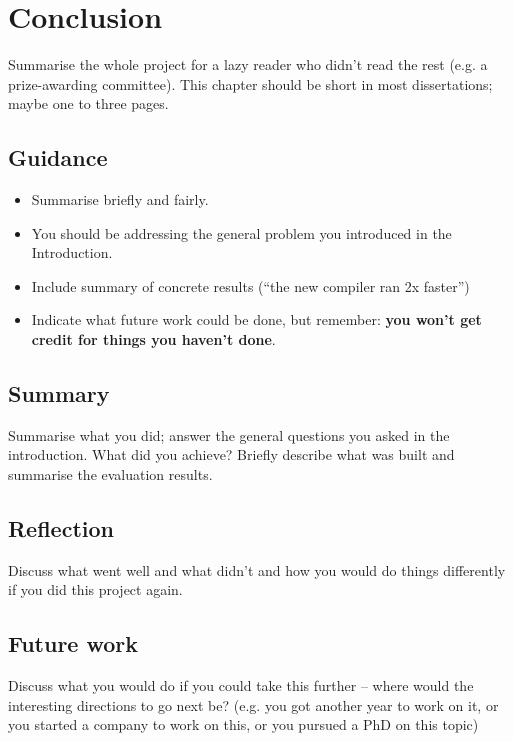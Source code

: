 \documentclass{l4proj}
\begin{document}
\chapter{Conclusion}


Summarise the whole project for a lazy reader who didn't read the rest (e.g. a prize-awarding committee). This chapter should be short in most dissertations; maybe one to three pages.
\section{Guidance}
\begin{itemize}
    \item
          Summarise briefly and fairly.
    \item
          You should be addressing the general problem you introduced in the
          Introduction.
    \item
          Include summary of concrete results (``the new compiler ran 2x
          faster'')
    \item
          Indicate what future work could be done, but remember: \textbf{you
              won't get credit for things you haven't done}.
\end{itemize}

\section{Summary}
Summarise what you did; answer the general questions you asked in the introduction. What did you achieve? Briefly describe what was built and summarise the evaluation results.

\section{Reflection}
Discuss what went well and what didn't and how you would do things differently if you did this project again.

\section{Future work}
Discuss what you would do if you could take this further -- where would the interesting directions to go next be? (e.g. you got another year to work on it, or you started a company to work on this, or you pursued a PhD on this topic)
\end{document}
